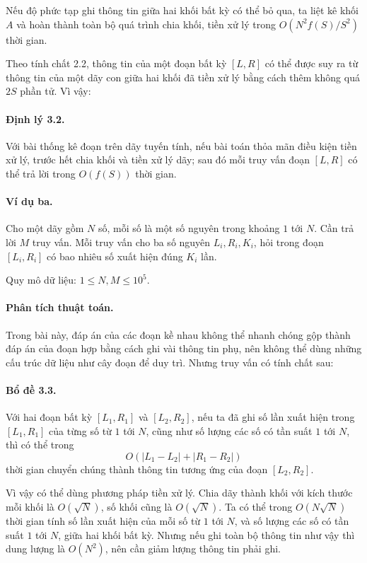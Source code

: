 \documentclass[11pt]{article}
\begin{document}
Nếu độ phức tạp ghi thông tin giữa hai khối bất kỳ có thể bỏ qua, ta liệt kê
khối \(A\) và hoàn thành toàn bộ quá trình chia khối, tiền xử lý trong
\(O(N^2f(S)/S^2)\) thời gian.

Theo tính chất 2.2, thông tin của một đoạn bất kỳ \([L,R]\) có thể được suy
ra từ thông tin của một dãy con giữa hai khối đã tiền xử lý bằng cách thêm
không quá \(2S\) phần tử. Vì vậy:

\paragraph{Định lý 3.2.}
Với bài thống kê đoạn trên dãy tuyến tính, nếu bài toán thỏa mãn điều kiện
tiền xử lý, trước hết chia khối và tiền xử lý dãy; sau đó mỗi truy vấn đoạn
\([L,R]\) có thể trả lời trong \(O(f(S))\) thời gian.

\paragraph{Ví dụ ba.}
Cho một dãy gồm \(N\) số, mỗi số là một số nguyên trong khoảng \(1\) tới
\(N\). Cần trả lời \(M\) truy vấn. Mỗi truy vấn cho ba số nguyên
\(L_i,R_i,K_i\), hỏi trong đoạn \([L_i,R_i]\) có bao nhiêu số xuất hiện đúng
\(K_i\) lần.

Quy mô dữ liệu: \(1\le N,M\le 10^5\).

\paragraph{Phân tích thuật toán.}
Trong bài này, đáp án của các đoạn kề nhau không thể nhanh chóng gộp thành
đáp án của đoạn hợp bằng cách ghi vài thông tin phụ, nên không thể dùng những
cấu trúc dữ liệu như cây đoạn để duy trì. Nhưng truy vấn có tính chất sau:

\paragraph{Bổ đề 3.3.}
Với hai đoạn bất kỳ \([L_1,R_1]\) và \([L_2,R_2]\), nếu ta đã ghi số lần xuất
hiện trong \([L_1,R_1]\) của từng số từ \(1\) tới \(N\), cũng như số lượng
các số có tần suất \(1\) tới \(N\), thì có thể trong
\[
  O(|L_1-L_2|+|R_1-R_2|)
\]
thời gian chuyển chúng thành thông tin tương ứng của đoạn \([L_2,R_2]\).

Vì vậy có thể dùng phương pháp tiền xử lý. Chia dãy thành khối với kích thước
mỗi khối là \(O(\sqrt N)\), số khối cũng là \(O(\sqrt N)\). Ta có thể trong
\(O(N\sqrt N)\) thời gian tính số lần xuất hiện của mỗi số từ \(1\) tới
\(N\), và số lượng các số có tần suất \(1\) tới \(N\), giữa hai khối bất kỳ.
Nhưng nếu ghi toàn bộ thông tin như vậy thì dung lượng là \(O(N^2)\), nên cần
giảm lượng thông tin phải ghi.
\end{document}

